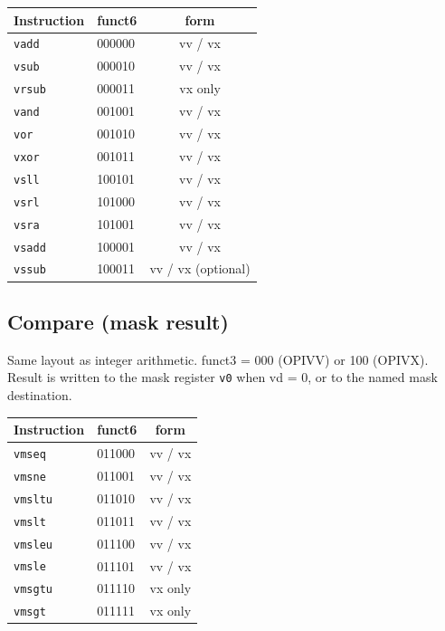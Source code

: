 \begin{center}
\begin{tabular}{@{}llc@{}}
\toprule
Instruction & funct6 & form \\
\midrule
\texttt{vadd}     & 000000 & vv / vx \\
\texttt{vsub}     & 000010 & vv / vx \\
\texttt{vrsub}    & 000011 & vx only \\
\texttt{vand}     & 001001 & vv / vx \\
\texttt{vor}      & 001010 & vv / vx \\
\texttt{vxor}     & 001011 & vv / vx \\
\texttt{vsll}     & 100101 & vv / vx \\
\texttt{vsrl}     & 101000 & vv / vx \\
\texttt{vsra}     & 101001 & vv / vx \\
\texttt{vsadd}    & 100001 & vv / vx \\
\texttt{vssub}    & 100011 & vv / vx (optional) \\
\bottomrule
\end{tabular}
\end{center}

\subsection{Compare (mask result)}

Same layout as integer arithmetic. funct3 = 000 (OPIVV) or 100 (OPIVX). Result is written to the mask register \texttt{v0} when vd = 0, or to the named mask destination.

\begin{center}
\begin{tabular}{@{}llc@{}}
\toprule
Instruction & funct6 & form \\
\midrule
\texttt{vmseq}  & 011000 & vv / vx \\
\texttt{vmsne}  & 011001 & vv / vx \\
\texttt{vmsltu} & 011010 & vv / vx \\
\texttt{vmslt}  & 011011 & vv / vx \\
\texttt{vmsleu} & 011100 & vv / vx \\
\texttt{vmsle}  & 011101 & vv / vx \\
\texttt{vmsgtu} & 011110 & vx only \\
\texttt{vmsgt}  & 011111 & vx only \\
\bottomrule
\end{tabular}
\end{center}

